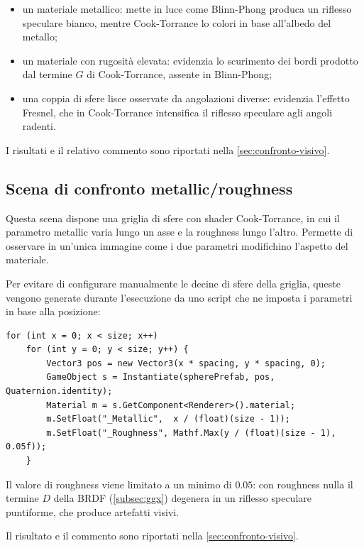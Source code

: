 \documentclass[12pt,a4paper,twoside]{book}
\begin{document}
\begin{itemize}
    \item un materiale metallico: mette in luce come Blinn-Phong produca un riflesso speculare bianco, mentre Cook-Torrance lo colori in base all'albedo del metallo;
    \item un materiale con rugosità elevata: evidenzia lo scurimento dei bordi prodotto dal termine $G$ di Cook-Torrance, assente in Blinn-Phong;
    \item una coppia di sfere lisce osservate da angolazioni diverse: evidenzia l'effetto Fresnel, che in Cook-Torrance intensifica il riflesso speculare agli angoli radenti.
\end{itemize}

I risultati e il relativo commento sono riportati nella \cref{sec:confronto-visivo}.

\begin{minipage}{\textwidth}

\subsection{Scena di confronto metallic/roughness}
\label{subsec:scena-griglia}

Questa scena dispone una griglia di sfere con shader Cook-Torrance, in cui il parametro metallic varia lungo un asse e la roughness lungo l'altro. Permette di osservare in un'unica immagine come i due parametri modifichino l'aspetto del materiale.

Per evitare di configurare manualmente le decine di sfere della griglia, queste vengono generate durante l'esecuzione da uno script che ne imposta i parametri in base alla posizione:

\begin{lstlisting}[style=hlsl,
    caption={Generazione procedurale della griglia metallic/roughness.},
    label={lst:material-grid}]
for (int x = 0; x < size; x++)
    for (int y = 0; y < size; y++) {
        Vector3 pos = new Vector3(x * spacing, y * spacing, 0);
        GameObject s = Instantiate(spherePrefab, pos, Quaternion.identity);
        Material m = s.GetComponent<Renderer>().material;
        m.SetFloat("_Metallic",  x / (float)(size - 1));
        m.SetFloat("_Roughness", Mathf.Max(y / (float)(size - 1), 0.05f));
    }
\end{lstlisting}

Il valore di roughness viene limitato a un minimo di $0.05$: con roughness nulla il termine $D$ della BRDF (\cref{subsec:ggx}) degenera in un riflesso speculare puntiforme, che produce artefatti visivi.

Il risultato e il commento sono riportati nella \cref{sec:confronto-visivo}.
\end{minipage}
\end{document}
